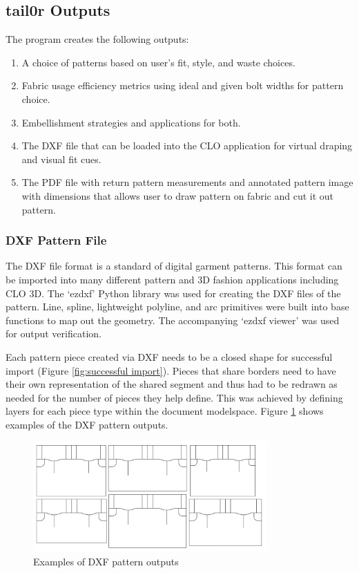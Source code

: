 \subsection{tail0r Outputs}
The program creates the following outputs:
\begin{enumerate}
    \item A choice of patterns based on user's fit, style, and waste choices.
    \item Fabric usage efficiency metrics using ideal and given bolt widths for pattern choice.
    \item Embellishment strategies and applications for both.
    \item The DXF file that can be loaded into the CLO application for virtual draping and visual fit cues.
    \item The PDF file with return pattern measurements and annotated pattern image with dimensions that allows user to draw pattern on fabric and cut it out pattern.
\end{enumerate}

\subsubsection{DXF Pattern File}
The DXF file format is a standard of digital garment patterns. This format can be imported into many different pattern and 3D fashion applications including CLO 3D. The `ezdxf’ Python library \cite{noauthor_spline_nodate} was used for creating the DXF files of the pattern. Line, spline, lightweight polyline, and arc primitives were built into base functions to map out the geometry. The accompanying `ezdxf viewer’ was used for output verification.

Each pattern piece created via DXF needs to be a closed shape for successful import (Figure \ref{fig:successful import}). Pieces that share borders need to have their own representation of the shared segment and thus had to be redrawn as needed for the number of pieces they help define. This was achieved by defining layers for each piece type within the document modelspace. Figure \ref{fig:example dxfs} shows examples of the DXF pattern outputs.

\begin{figure} [H]
    \centering
    \includegraphics[width = 0.8\textwidth]{Images/example dxfs.png}
    \caption{Examples of DXF pattern outputs}
    \label{fig:example dxfs}
\end{figure}

